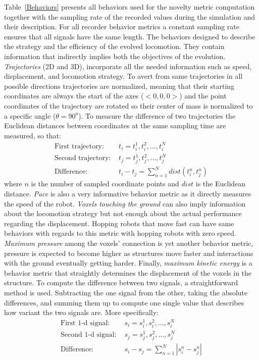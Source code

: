 Table~\ref{Behaviors} presents all behaviors used for the novelty metric computation together with the sampling rate of the recorded values during the simulation and their description. For all recorder behavior metrics a constant sampling rate ensures that all signals have the same length. The behaviors designed to describe the strategy and the efficiency of the evolved  locomotion. They contain information that indirectly implies both the objectives of the evolution. \emph{Trajectories} (2D and 3D), incorporate all the needed information such as speed, displacement, and locomotion strategy. To avert from same trajectories in all possible directions trajectories are normalized, meaning that their starting coordinates are always the start of the axes ($<0,0,0>$) and the point coordinates of the trajectory are rotated so their center of mass is normalized to a specific angle ($\theta = 90^{o}$). To measure the difference of two trajectories the Euclidean distances between coordinates at the same sampling time are measured, so that:
\begin{align}
\text{First trajectory: } &t_i = t_i^1, t_i^2, \ldots, t_i^N\\
\text{Second trajectory: } &t_j = t_j^1, t_j^2, \ldots, t_j^N\\
\text{Difference: } &t_i - t_j = \sum_{n=1}^{N} dist( t_i^n, t_j^n )
\end{align}
where $n$ is the number of sampled coordinate points and $dist$ is the Euclidean distance. \emph{Pace} is also a very informative behavior metric as it directly measures the speed of the robot. \emph{Voxels touching the ground} can also imply information about the locomotion strategy but not enough about the actual performance regarding the displacement. Hopping robots that move fast can have same behaviors with regards to this metric with hopping robots with zero speed. \emph{Maximum pressure} among the voxels' connection is yet another behavior metric, pressure is expected to become higher as structures move faster and interactions with the ground eventually getting harder. Finally, \emph{maximum kinetic energy} is a behavior metric that straightly determines the displacement of the voxels in the structure. To compute the difference between two signals, a straightforward method is used. Subtracting the one signal from the other, taking the absolute differences, and summing them up to compute one single value that describes how variant the two signals are. More specifically:
\begin{align}
\text{First 1-d signal: } &s_i = s_i^1, s_i^2, \ldots, s_i^N\\
\text{Second 1-d signal: } &s_j = s_j^1, s_j^2, \ldots, s_j^N\\
\text{Difference: } &s_i - s_j = \sum_{n=1}^{N} | s_i^n - s_j^n |
\end{align}
